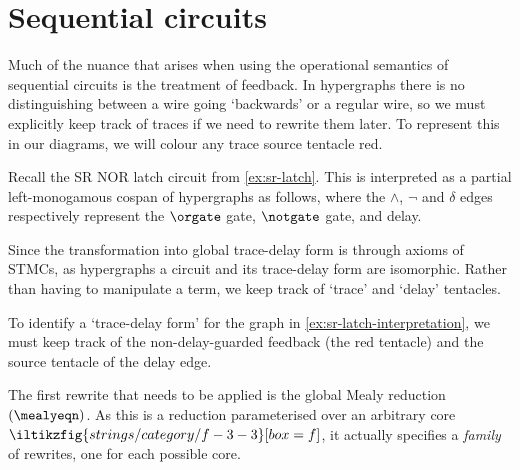 \section{Sequential circuits}

Much of the nuance that arises when using the operational semantics of
sequential circuits is the treatment of feedback.
In hypergraphs there is no distinguishing between a wire going
`backwards' or a regular wire, so we must explicitly keep track of traces if we
need to rewrite them later.
To represent this in our diagrams, we will colour any trace source tentacle red.

\begin{example}\label{ex:sr-latch-interpretation}
    Recall the SR NOR latch circuit from \cref{ex:sr-latch}.
    This is interpreted as a partial left-monogamous cospan of hypergraphs as
    follows, where the \(\wedge\), \(\neg\) and \(\delta\) edges respectively
    represent the \(\orgate\) gate, \(\notgate\) gate, and delay.
    \begin{center}
    \end{center}
\end{example}

Since the transformation into global trace-delay form is through axioms
of STMCs, as hypergraphs a circuit and its trace-delay form are isomorphic.
Rather than having to manipulate a term, we keep track of `trace' and `delay'
tentacles.

\begin{example}\label{ex:sr-latch-global-delay}
    To identify a `trace-delay form' for the graph in
    \cref{ex:sr-latch-interpretation}, we must keep track of the
    non-delay-guarded feedback (the red tentacle) and the source tentacle of the
    delay edge.
\end{example}

The first rewrite that needs to be applied is the global Mealy reduction
\((\mealyeqn)\).
As this is a reduction parameterised over an arbitrary core \(
\iltikzfig{strings/category/f-3-3}[box=f]
\), it actually specifies a \emph{family} of rewrites, one for each possible
core.

